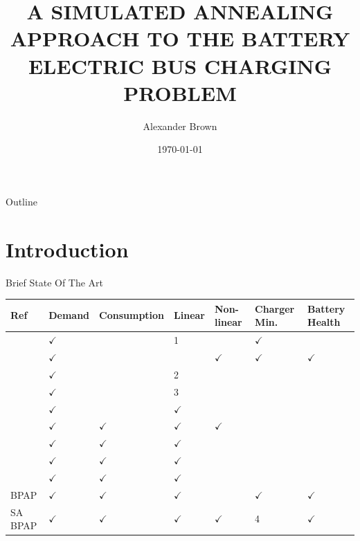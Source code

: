 \documentclass[aspectratio=169]{beamer}
\institute[USU] %
{
College of Engineering\\
Utah State University
}
\author{Alexander Brown}
\date{\today}
\title{A SIMULATED ANNEALING APPROACH TO THE BATTERY ELECTRIC BUS CHARGING PROBLEM}
\begin{document}
\maketitle
\begin{frame}{Outline}
\tableofcontents
\end{frame}


\section{Introduction}
\label{sec:orgc5a6d96}
\begin{frame}[label={sec:org285a9d6}]{Brief State Of The Art}
{\scriptsize
\begin{center}
\begin{tabularx}{\textwidth}{XXXXXXX}
\hline
Ref & Demand & Consumption & Linear & Non-linear & Charger Min. & Battery Health\\[0pt]
\hline
\cite{zhou-2020-bi-objec} & \(\checkmark\) &  & 1 &  & \(\checkmark\) & \\[0pt]
\cite{whitaker-2023-a-network} & \(\checkmark\) &  &  & \(\checkmark\) & \(\checkmark\) & \(\checkmark\)\\[0pt]
\cite{zhou-2020-collab-optim} & \(\checkmark\) &  & 2 &  &  & \\[0pt]
\cite{duan-2021-refor-mixed} & \(\checkmark\) &  & 3 &  &  & \\[0pt]
\cite{rinaldi-2020-mixed-fleet} & \(\checkmark\) &  & \(\checkmark\) &  &  & \\[0pt]
\cite{jahic-2019-preem} & \(\checkmark\) & \(\checkmark\) & \(\checkmark\) & \(\checkmark\) &  & \\[0pt]
\cite{frendo-2021-open-sourc} & \(\checkmark\) & \(\checkmark\) & \(\checkmark\) &  &  & \\[0pt]
\cite{qin-2016-numer-analy} & \(\checkmark\) & \(\checkmark\) & \(\checkmark\) &  &  & \\[0pt]
\cite{mortensen-2023-cost-minim} & \(\checkmark\) & \(\checkmark\) & \(\checkmark\) &  &  & \\[0pt]
BPAP & \(\checkmark\) & \(\checkmark\) & \(\checkmark\) &  & \(\checkmark\) & \(\checkmark\)\\[0pt]
SA BPAP & \(\checkmark\) & \(\checkmark\) & \(\checkmark\) & \(\checkmark\) & 4 & \(\checkmark\)\\[0pt]
\hline
\end{tabularx}
\end{center}
}
\end{frame}
\end{document}
